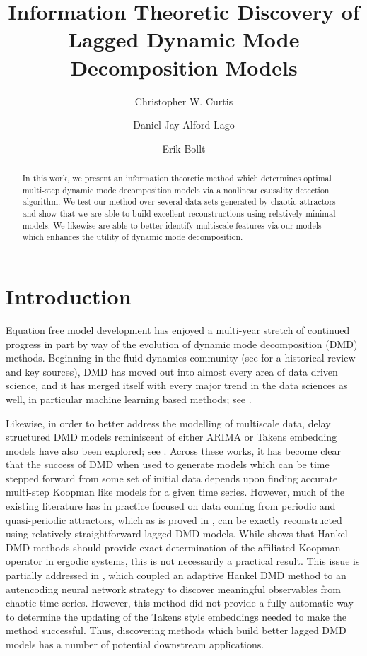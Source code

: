 \documentclass[a4paper,11pt]{article}
\title{Information Theoretic Discovery of Lagged Dynamic Mode Decomposition Models}
\author[1]{Christopher W. Curtis}
\author[1,2]{Daniel Jay Alford-Lago}
\author[3,4]{Erik Bollt}
\affil[1]{Department of Mathematics and Statistics, SDSU}
\affil[2]{Naval Information Warfare Center}
\affil[3]{Department of Electrical and Computer Engineering, Clarkson University}
\affil[4]{Clarkson Center for Complex Systems Science, Clarkson University}
\date{}
\begin{document}
\maketitle

\begin{abstract}
In this work, we present an information theoretic method which determines optimal multi-step dynamic mode decomposition models via a nonlinear causality detection algorithm.  We test our method over several data sets generated by chaotic attractors and show that we are able to build excellent reconstructions using relatively minimal models.  We likewise are able to better identify multiscale features via our models which enhances the utility of dynamic mode decomposition.   
\end{abstract}

\section{Introduction}

Equation free model development has enjoyed a multi-year stretch of continued progress in part by way of the evolution of dynamic mode decomposition (DMD) methods.  Beginning in the fluid dynamics community (see \cite{taira} for a historical review and key sources), DMD has moved out into almost every area of data driven science, and it has merged itself with every major trend in the data sciences as well, in particular machine learning based methods; see \cite{lusch, azencot, lago_dldmd}.  

Likewise, in order to better address the modelling of multiscale data, delay structured DMD models reminiscent of either ARIMA or Takens embedding models have also been explored; see \cite{arbabi, clainche, duraisamy, champion2, kutz4, curtis_dldmd}.  Across these works, it has become clear that the success of DMD when used to generate models which can be time stepped forward from some set of initial data depends upon finding accurate multi-step Koopman like models for a given time series.  However, much of the existing literature has in practice focused on data coming from periodic and quasi-periodic attractors, which as is proved in \cite{duraisamy}, can be exactly reconstructed using relatively straightforward lagged DMD models.  While \cite{arbabi} shows that Hankel-DMD methods should provide exact determination of the affiliated Koopman operator in ergodic systems, this is not necessarily a practical result.  This issue is partially addressed in \cite{curtis_dldmd}, which coupled an adaptive Hankel DMD method to an autencoding neural network strategy to discover meaningful observables from chaotic time series.  However, this method did not provide a fully automatic way to determine the updating of the Takens style embeddings needed to make the method successful.  Thus, discovering methods which build better lagged DMD models has a number of potential downstream applications.  
\end{document}
